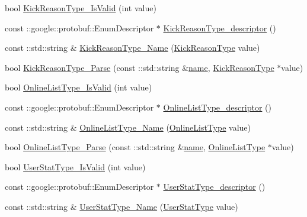 \begin{DoxyCompactItemize}
\item 
bool \hyperlink{namespace_i_m_1_1_base_define_a572bcc1d44b2f2fbdd640a82af776812}{Kick\+Reason\+Type\+\_\+\+Is\+Valid} (int value)
\item 
const \+::google\+::protobuf\+::\+Enum\+Descriptor $\ast$ \hyperlink{namespace_i_m_1_1_base_define_a8fb48b44f387bfee805ef0caf232ebeb}{Kick\+Reason\+Type\+\_\+descriptor} ()
\item 
const \+::std\+::string \& \hyperlink{namespace_i_m_1_1_base_define_aced2430487a34bfeb3fb10c948bbf378}{Kick\+Reason\+Type\+\_\+\+Name} (\hyperlink{namespace_i_m_1_1_base_define_a7ac3ce0aff5b2d7dec30a6876d9e6b75}{Kick\+Reason\+Type} value)
\item 
bool \hyperlink{namespace_i_m_1_1_base_define_a97f89a0063eda8d8c16c4e8fd15b00ae}{Kick\+Reason\+Type\+\_\+\+Parse} (const \+::std\+::string \&\hyperlink{http__parser_8c_a8f8f80d37794cde9472343e4487ba3eb}{name}, \hyperlink{namespace_i_m_1_1_base_define_a7ac3ce0aff5b2d7dec30a6876d9e6b75}{Kick\+Reason\+Type} $\ast$value)
\item 
bool \hyperlink{namespace_i_m_1_1_base_define_a16bd0ff170871ac825bb37cbc51cc591}{Online\+List\+Type\+\_\+\+Is\+Valid} (int value)
\item 
const \+::google\+::protobuf\+::\+Enum\+Descriptor $\ast$ \hyperlink{namespace_i_m_1_1_base_define_adad2d8a4f433a806ef82bfe357a2a6bd}{Online\+List\+Type\+\_\+descriptor} ()
\item 
const \+::std\+::string \& \hyperlink{namespace_i_m_1_1_base_define_a717b9c7c76678efc00fc0871df77104f}{Online\+List\+Type\+\_\+\+Name} (\hyperlink{namespace_i_m_1_1_base_define_aec94260a9c0d1eae6f84ff6e7a5f669c}{Online\+List\+Type} value)
\item 
bool \hyperlink{namespace_i_m_1_1_base_define_ac57eb3052961830ad0731601e774a95f}{Online\+List\+Type\+\_\+\+Parse} (const \+::std\+::string \&\hyperlink{http__parser_8c_a8f8f80d37794cde9472343e4487ba3eb}{name}, \hyperlink{namespace_i_m_1_1_base_define_aec94260a9c0d1eae6f84ff6e7a5f669c}{Online\+List\+Type} $\ast$value)
\item 
bool \hyperlink{namespace_i_m_1_1_base_define_aef9588d12231385c79df642c7a026981}{User\+Stat\+Type\+\_\+\+Is\+Valid} (int value)
\item 
const \+::google\+::protobuf\+::\+Enum\+Descriptor $\ast$ \hyperlink{namespace_i_m_1_1_base_define_a4e1768530156e21837a4b93733c51814}{User\+Stat\+Type\+\_\+descriptor} ()
\item 
const \+::std\+::string \& \hyperlink{namespace_i_m_1_1_base_define_adcc923dd896478f46f4db0b1329b9ad2}{User\+Stat\+Type\+\_\+\+Name} (\hyperlink{namespace_i_m_1_1_base_define_adaf1a78b7a7db0195b92cc1786d93c01}{User\+Stat\+Type} value)

\end{DoxyCompactItemize}
